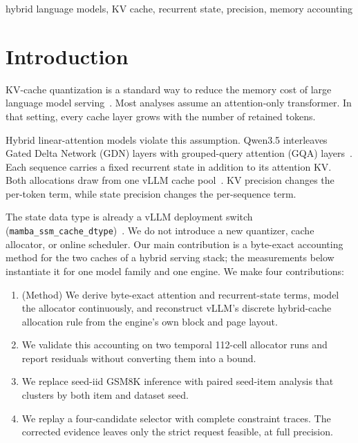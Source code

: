 \documentclass[conference,letterpaper,10pt]{IEEEtran}
\begin{document}
\begin{IEEEkeywords}
hybrid language models, KV cache, recurrent state, precision, memory accounting
\end{IEEEkeywords}


\section{Introduction}
\label{sec:intro}

KV-cache quantization is a standard way to reduce the memory cost of large
language model serving~\cite{kivi,kvquant,minikv}. Most analyses assume an
attention-only transformer. In that setting, every cache layer grows with the
number of retained tokens.

Hybrid linear-attention models violate this assumption. Qwen3.5 interleaves
Gated Delta Network (GDN) layers with grouped-query attention (GQA)
layers~\cite{gateddeltanet,qwen35}. Each sequence carries a fixed recurrent
state in addition to its attention KV. Both allocations draw from one vLLM
cache pool~\cite{vllm}. KV precision changes the per-token term, while state
precision changes the per-sequence term.

The state data type is already a vLLM deployment switch
(\texttt{mamba\_ssm\_cache\_dtype})~\cite{vllmpr22196}. We do not introduce a
new quantizer, cache allocator, or online scheduler. Our main contribution is
a byte-exact accounting method for the two caches of a hybrid serving stack;
the measurements below instantiate it for one model family and one engine. We
make four contributions:

\begin{enumerate}
\item (Method) We derive byte-exact attention and recurrent-state terms, model
the allocator continuously, and reconstruct vLLM's discrete hybrid-cache
allocation rule from the engine's own block and page layout.
\item We validate this accounting on two temporal 112-cell allocator runs and
report residuals without converting them into a bound.
\item We replace seed-iid GSM8K inference with paired seed-item analysis that
clusters by both item and dataset seed.
\item We replay a four-candidate selector with complete constraint traces. The
corrected evidence leaves only the strict request feasible, at full precision.
\end{enumerate}
\end{document}
